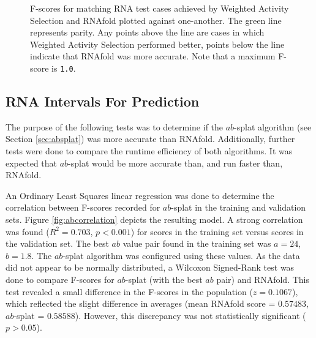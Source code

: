 \documentclass{cshonours}
\begin{document}
\begin{figure}
\begin{center}
\end{center}
\caption{F-scores for matching RNA test cases achieved by Weighted Activity Selection and RNAfold plotted against one-another. The green line represents parity. Any points above the line are cases in which Weighted Activity Selection performed better, points below the line indicate that RNAfold was more accurate. Note that a maximum F-score is \texttt{1.0}.}
\label{fig:wasrnafold}
\end{figure}


\subsection{RNA Intervals For Prediction}
\label{sec:res_absplat}
The purpose of the following tests was to determine if the $ab$-splat algorithm (see Section \ref{sec:absplat}) was more accurate than RNAfold. Additionally, further tests were done to compare the runtime efficiency of both algorithms. It was expected that $ab$-splat would be more accurate than, and run faster than, RNAfold.

An Ordinary Least Squares linear regression was done to determine the correlation between F-scores recorded for $ab$-splat in the training and validation sets. Figure \ref{fig:abcorrelation} depicts the resulting model. A strong correlation was found ($R^2 = 0.703$, $p < 0.001$) for scores in the training set versus scores in the validation set. The best $ab$ value pair found in the training set was $a = 24$, $b = 1.8$. The $ab$-splat algorithm was configured using these values. As the data did not appear to be normally distributed, a Wilcoxon Signed-Rank test was done to compare F-scores for $ab$-splat (with the best $ab$ pair) and RNAfold. This test revealed a small difference in the F-scores in the population ($z = 0.1067$), which reflected the slight difference in averages (mean RNAfold score = $0.57483$, $ab$-splat = $0.58588$). However, this discrepancy was not statistically significant ($p > 0.05$).
\end{document}
